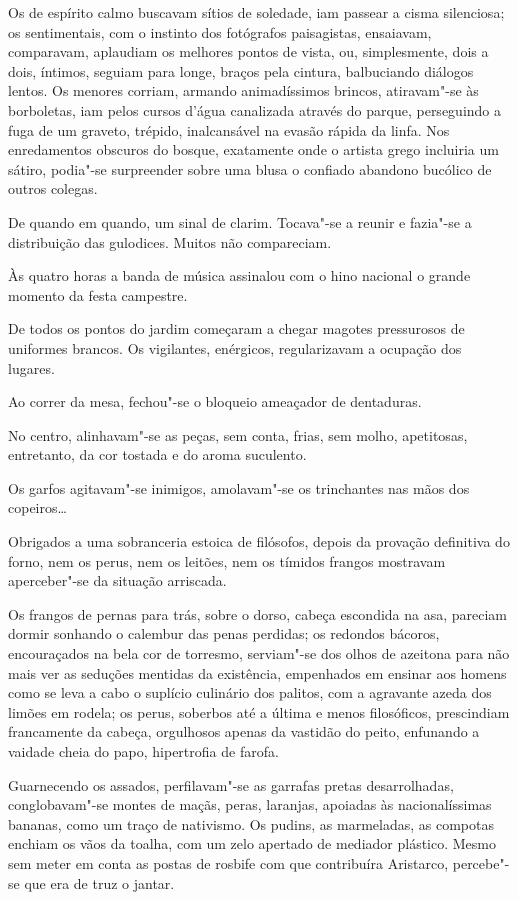 Os de espírito calmo
buscavam sítios de soledade, iam passear a cisma silenciosa; os
sentimentais, com o instinto dos fotógrafos paisagistas, ensaiavam,
comparavam, aplaudiam os melhores pontos de vista, ou, simplesmente,
dois a dois, íntimos, seguiam para longe, braços pela cintura,
balbuciando diálogos lentos. Os menores corriam, armando animadíssimos
brincos, atiravam"-se às borboletas, iam pelos cursos d'água
canalizada através do parque, perseguindo a fuga de um graveto,
trépido, inalcansável na evasão rápida da linfa. Nos enredamentos
obscuros do bosque, exatamente onde o artista grego incluiria um
sátiro, podia"-se surpreender sobre uma blusa o confiado abandono
bucólico de outros colegas. 

De quando em quando, um sinal de clarim.
Tocava"-se a reunir e fazia"-se a distribuição das gulodices. Muitos
não compareciam. 

Às quatro horas a banda de música assinalou com o hino
nacional o grande momento da festa campestre. 

De todos os pontos do
jardim começaram a chegar magotes pressurosos de uniformes brancos. Os
vigilantes, enérgicos, regularizavam a ocupação dos lugares. 

Ao correr da mesa, fechou"-se o bloqueio ameaçador de dentaduras. 

No centro, alinhavam"-se as peças, sem conta, frias, sem molho, apetitosas,
entretanto, da cor tostada e do aroma suculento. 

Os garfos agitavam"-se inimigos, amolavam"-se os trinchantes nas mãos dos
copeiros\ldots{} 

Obrigados a uma sobranceria estoica de filósofos, depois da
provação definitiva do forno, nem os perus, nem os leitões, nem os
tímidos frangos mostravam aperceber"-se da situação arriscada. 

Os frangos de pernas para trás, sobre o dorso, cabeça escondida na asa,
pareciam dormir sonhando o calembur das penas perdidas; os redondos
bácoros, encouraçados na bela cor de torresmo, serviam"-se 
dos olhos de azeitona para não mais ver as seduções mentidas da
existência, empenhados em ensinar aos homens como se leva a cabo o
suplício culinário dos palitos, com a agravante azeda dos limões em
rodela; os perus, soberbos até a última e menos filosóficos,
prescindiam francamente da cabeça, orgulhosos apenas da vastidão do
peito, enfunando a vaidade cheia do papo, hipertrofia de farofa.

Guarnecendo os assados, perfilavam"-se as garrafas pretas
desarrolhadas, conglobavam"-se montes de maçãs, peras, laranjas,
apoiadas às nacionalíssimas bananas, como um traço de nativismo. Os
pudins, as marmeladas, as compotas enchiam os vãos da toalha, com um
zelo apertado de mediador plástico. Mesmo sem meter em conta as postas
de rosbife com que contribuíra Aristarco, percebe"-se que era de truz
o jantar. 

